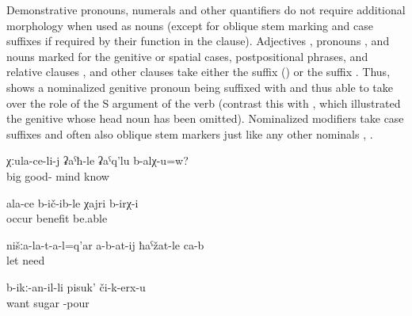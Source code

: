 Demonstrative pronouns, numerals and other quantifiers do not require additional morphology when used as nouns (except for oblique stem marking and case suffixes if required by their function in the clause). Adjectives , pronouns , and nouns marked for the genitive  or spatial cases, postpositional phrases, and relative clauses , and other clauses take either the suffix  () or the suffix . Thus,  shows a nominalized genitive pronoun being suffixed with  and thus able to take over the role of the S argument of the verb  (contrast this with , which illustrated the genitive whose head noun has been omitted). Nominalized modifiers take case suffixes and often also oblique stem markers just like any other nominals , .
%
\begin{exe}

	\ex	\label{ex:Does an older (person) know it better, (or a young guy)}
	\gll	χːula-ce-li-j	ʡaˁħ-le	ʡaˁq'lu	b-alχ-u=w?\\
		big	good-	mind	know\\
	\glt	{}

	\ex	\label{ex:(I) could profit from yours}
	\gll	ala-ce	b-ič-ib-le	χajri	b-irχ-i\\
			occur	benefit	be.able\\
	\glt	{}
	
	\ex	\label{ex:‎‎‎Ours should not be let. (i.e. our people should not be allowed to sell our land)}
	\gll	nišːa-la-t-a-l=q'ar	a-b-at-ij	ħaˁžat-le	ca-b\\
			let	need	\\
	\glt	{}

	\ex	\label{ex:Who wants to pours sugar (on the dish)}
	\gll	b-ikː-an-il-li	pisuk'	či-k-erx-u\\
		want	sugar	-pour\\
	\glt	{}
\end{exe}

